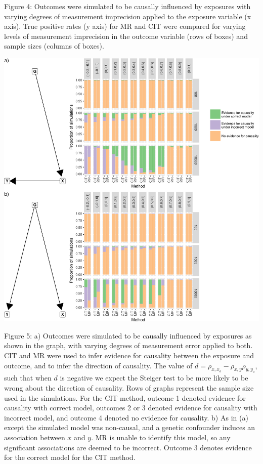 \documentclass[]{article}
\begin{document}
Figure 4: Outcomes were simulated to be causally influenced by exposures
with varying degrees of measurement imprecision applied to the exposure
variable (x axis). True positive rates (y axis) for MR and CIT were
compared for varying levels of measurement imprecision in the outcome
variable (rows of boxes) and sample sizes (columns of boxes).

\newpage

\includegraphics{manuscript_files/figure-latex/cit_mr_comparison_figure-1.pdf}

Figure 5: a) Outcomes were simulated to be causally influenced by
exposures as shown in the graph, with varying degrees of measurement
error applied to both. CIT and MR were used to infer evidence for
causality between the exposure and outcome, and to infer the direction
of causality. The value of
\(d = \rho_{x, x_o} - \rho_{x,y}\rho_{y,y_o}\), such that when \(d\) is
negative we expect the Steiger test to be more likely to be wrong about
the direction of causality. Rows of graphs represent the sample size
used in the simulations. For the CIT method, outcome 1 denoted evidence
for causality with correct model, outcomes 2 or 3 denoted evidence for
causality with incorrect model, and outcome 4 denoted no evidence for
causality. b) As in (a) except the simulated model was non-causal, and a
genetic confounder induces an association between \(x\) and \(y\). MR is
unable to identify this model, so any significant associations are
deemed to be incorrect. Outcome 3 denotes evidence for the correct model
for the CIT method.
\end{document}
